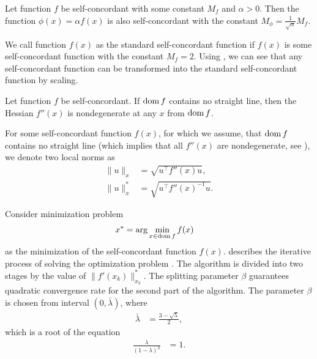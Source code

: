 \begin{corollary}
  Let function $f$ be self-concordant with some constant $M_f$ and $\alpha > 0$. Then the function $\phi(x) = \alpha f(x)$ is also self-concordant with the constant $M_\phi = \frac{1}{\sqrt{\alpha}}M_f$.
\end{corollary}

We call function $f(x)$ as the standard self-concordant function if $f(x)$ is some self-concordant function with the constant $M_f = 2$. Using , we can see that any self-concordant function can be transformed into the standard self-concordant function by scaling.

\begin{theorem}
  Let function $f$ be self-concordant. If $\operatorname{dom} f$ contains no straight line, then the Hessian $f''(x)$ is nondegenerate at any $x$ from $\operatorname{dom} f$.
\end{theorem}

For some self-concordant function $f(x)$, for which we assume, that $\operatorname{dom} f$ contains no straight line (which implies that all $f''(x)$ are nondegenerate, see ), we denote two local norms as
\begin{align}
  \| u \|_x &= \sqrt{u^\top f''(x) u},\\
  \| u \|_x^* &= \sqrt{u^\top f''(x)^{-1} u}.
\end{align}

Consider minimization problem
\begin{align}
  x^* &= \arg\min_{x\in\dom f} f(x)\labeleq{SDP:scf:minProblem}
\end{align}
as the minimization of the self-concordant function $f(x)$.
 describes the iterative process of solving the optimization problem .
The algorithm is divided into two stages by the value of $\|f'(x_k)\|_{x_k}^*$.
The splitting parameter $\beta$ guarantees quadratic convergence rate for the second part of the algorithm. The parameter $\beta$ is chosen from interval $(0, \bar{\lambda})$, where
\begin{align}
  \bar{\lambda} &= \frac{3 - \sqrt{5}}{2},
\end{align}
which is a root of the equation
\begin{align}
  \frac{\lambda}{(1-\lambda)^2} &= 1.
\end{align}



